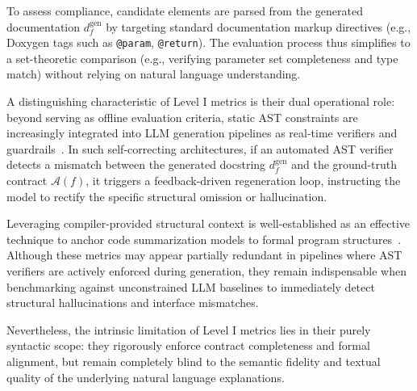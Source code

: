 To assess compliance, candidate elements are parsed from the generated documentation $d_f^{\mathrm{gen}}$ by targeting standard documentation markup directives (e.g., Doxygen tags such as \texttt{@param}, \texttt{@return}). The evaluation process thus simplifies to a set-theoretic comparison (e.g., verifying parameter set completeness and type match) without relying on natural language understanding. 

A distinguishing characteristic of Level I metrics is their dual operational role: beyond serving as offline evaluation criteria, static AST constraints are increasingly integrated into LLM generation pipelines as real-time verifiers and guardrails~\cite{pomian_together_2024}. In such self-correcting architectures, if an automated AST verifier detects a mismatch between the generated docstring $d_f^{\mathrm{gen}}$ and the ground-truth contract $\mathcal{A}(f)$, it triggers a feedback-driven regeneration loop, instructing the model to rectify the specific structural omission or hallucination. 

Leveraging compiler-provided structural context is well-established as an effective technique to anchor code summarization models to formal program structures~\cite{lomshakov_proconsul_2024}. Although these metrics may appear partially redundant in pipelines where AST verifiers are actively enforced during generation, they remain indispensable when benchmarking against unconstrained LLM baselines to immediately detect structural hallucinations and interface mismatches. 

Nevertheless, the intrinsic limitation of Level I metrics lies in their purely syntactic scope: they rigorously enforce contract completeness and formal alignment, but remain completely blind to the semantic fidelity and textual quality of the underlying natural language explanations.


